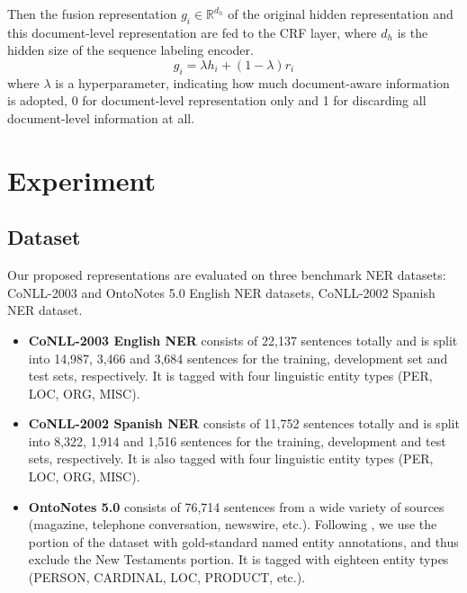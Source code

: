 \documentclass[letterpaper]{article} \usepackage{aaai20}  \usepackage{times}  \usepackage{helvet} \usepackage{courier}  \usepackage[hyphens]{url}  \usepackage{graphicx} \urlstyle{rm} \def\UrlFont{\rm}  \usepackage{graphicx}  \frenchspacing  \setlength{\pdfpagewidth}{8.5in}  \setlength{\pdfpageheight}{11in}
\begin{document}
Then the fusion representation $g_i \in \mathbb{R} ^ { d_h}$ of the original hidden representation and this document-level representation are fed to the CRF layer, where $d_h$ is the hidden size of the sequence labeling encoder.
\begin{equation}
    g_i = \lambda h_i + (1 - \lambda)r_i
\end{equation}
where $\lambda$ is a hyperparameter, indicating how much document-aware information is adopted, 0 for document-level representation only and 1 for discarding all document-level information at all.

\section{Experiment}

\subsection{Dataset}
Our proposed representations are evaluated on three benchmark NER datasets: CoNLL-2003 \cite{sang2003introduction} and OntoNotes 5.0  \cite{pradhan2013towards} English NER datasets, CoNLL-2002 Spanish NER \cite{Erik2002introduction} dataset. 

\begin{itemize}
    \item \textbf{CoNLL-2003 English NER} consists of 22,137 sentences
    totally and is split into 14,987, 3,466 and 3,684 sentences
    for the training, development set and test sets, respectively. It is tagged with four linguistic
    entity types (PER, LOC, ORG, MISC).
    \item  \textbf{CoNLL-2002 Spanish NER} consists of 11,752 sentences totally and is split into 8,322, 1,914 and 1,516 sentences
    for the training, development and test sets, respectively. It is also tagged with four linguistic
    entity types (PER, LOC, ORG, MISC).
    \item \textbf{OntoNotes 5.0} consists of 76,714 sentences
    from a wide variety of sources (magazine, telephone conversation,
    newswire, etc.). Following \cite{chiu2016named,chen2019grn}, we use the portion of the dataset with gold-standard named
    entity annotations, and thus exclude the New Testaments
    portion. It is tagged with eighteen entity types (PERSON, CARDINAL, LOC, PRODUCT, etc.).
\end{itemize}
\end{document}

